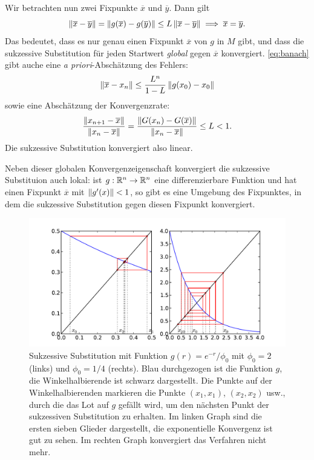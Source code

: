 Wir betrachten nun zwei Fixpunkte $\overline{x}$ und $\overline{y}$. Dann gilt
\begin{equation}
  \left\lVert{\overline{x} - \overline{y}}\right\rVert = \left\lVert{g(\overline{x}) -
    g(\overline{y})}\right\rVert \le L \left\lVert{\overline{x} - \overline{y}}\right\rVert \implies
  \overline{x} = \overline{y}.
\end{equation}
Das bedeutet, dass es nur genau einen Fixpunkt $\overline{x}$ von $g$
in $M$ gibt, und dass die sukzessive Substitution für jeden Startwert
\emph{global} gegen $\overline{x}$ konvergiert. \eqref{eq:banach}
gibt auche eine \textit{a priori}-Abschätzung des Fehlers:
\begin{equation}
  \left\lVert{\overline{x} - x_n}\right\rVert \le \frac{L^n}{1-L}\left\lVert{g(x_0) - x_0}\right\rVert
\end{equation}
sowie eine Abschätzung der Konvergenzrate:
\begin{equation}
  \frac{\left\lVert{x_{n+1} - \overline{x}}\right\rVert}{\left\lVert{x_n - \overline{x}}\right\rVert}
  = \frac{\left\lVert{G(x_n) - G(\overline{x})}\right\rVert}{\left\lVert{x_n - \overline{x}}\right\rVert}
  \le L < 1.
\end{equation}
Die sukzessive Substitution konvergiert also linear.

Neben dieser globalen Konvergenzeigenschaft konvergiert die sukzessive
Substituion auch lokal: ist $g:\mathbb{R}^n\to\mathbb{R}^n$ eine differenzierbare
Funktion und hat einen Fixpunkt $\overline{x}$ mit $\left\lVert{g'(x)}\right\rVert < 1$,
so gibt es eine Umgebung des Fixpunktes, in dem die sukzessive
Substitution gegen diesen Fixpunkt konvergiert.

\begin{figure}
  \centering
  \includegraphics[width=\textwidth]{plots/banach}
  \caption{Sukzessive Substitution mit Funktion $g(r) = e^{-r}/\phi_0$
    mit $\phi_0=2$ (links) und $\phi_0=1/4$ (rechts). Blau
    durchgezogen ist die Funktion $g$, die Winkelhalbierende ist
    schwarz dargestellt. Die Punkte auf der Winkelhalbierenden
    markieren die Punkte $(x_1,x_1)$, $(x_2,x_2)$ usw., durch die das
    Lot auf $g$ gefällt wird, um den nächsten Punkt der sukzessiven
    Substitution zu erhalten. Im linken Graph sind die ersten sieben
    Glieder dargestellt, die exponentielle Konvergenz ist gut zu
    sehen. Im rechten Graph konvergiert das Verfahren nicht mehr.}
  \label{fig:banach}
\end{figure}

